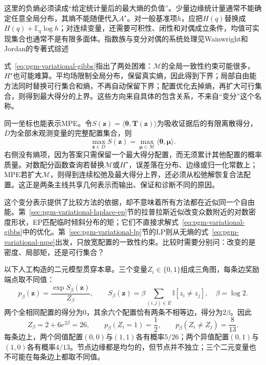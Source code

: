 这里的负熵必须读成“给定统计量后的最大熵的负值”。少量边缘统计量通常不能确定任意全局分布，其熵不能随便代入$A^\star$。对一般基准项$h$，应把$H(q)$替换成$H(q)+\mathbb E_q\log h$；对连续变量，还需要可积性、闭性和对偶成立条件，均值可实现集合也通常不是有限多面体。指数族与变分对偶的系统处理见Wainwright和Jordan的专著式综述

式~\eqref{eq:pgm-variational-gibbs}指出了两处困难：$\mathcal M$的全局一致性约束可能很多，$H^\star$也可能难算。平均场限制全局分布，保留真实熵，因此得到下界；局部自由能方法同时替换可行集合和熵，不再自动保留下界；配置优化去掉熵，再扩大可行集合，则得到最大得分的上界。这些方向来自具体的包含关系，不来自“变分”这个名称。

同一坐标也能表示MPE。令$S(\bm z)=\langle\bm{\theta},\bm T(\bm z)\rangle$为吸收证据后的有限离散得分，$D$为全部未观测变量的完整配置集合，则
\begin{equation}
  \max_{\bm z\in D}S(\bm z)
    =\max_{\bm{\mu}\in\mathcal M}
       \langle\bm{\theta},\bm{\mu}\rangle.
  \label{eq:pgm-variational-mpe}
\end{equation}
右侧没有熵项，因为答案只需保留一个最大得分配置，而无须累计其他配置的概率质量。对数配分函数查询若替换$\mathcal M$或$H^\star$，误差落在分布、边缘或归一化常数上；MPE若扩大$\mathcal M$，则得到连续松弛及最大得分上界，还必须从松弛解恢复合法配置。这正是两条主线共享几何表示而输出、保证和诊断不同的原因。

这个变分表示提供了比较方法的依据，却不意味着所有方法都在近似同一个自由能。第~\ref{sec:pgm-variational-laplace-ep}节的拉普拉斯近似改变众数附近的对数密度形状，EP匹配临时倾斜分布的矩；它们不直接求解式~\eqref{eq:pgm-variational-gibbs}中的优化。第~\ref{sec:pgm-variational-lp}节的LP则从无熵的式~\eqref{eq:pgm-variational-mpe}出发，只放宽配置的一致性约束。比较时需要分别问：改变的是密度、局部矩，还是可行集合？

\begin{example}[三角图的精确基准]
  \label{ex:pgm-variational-triangle}
  以下人工构造的二元模型贯穿本章。三个变量$Z_i\in\{0,1\}$组成三角图，每条边奖励端点取不同值：
  \begin{equation}
    p_\beta(\bm{z})=\frac{\exp S_\beta(\bm{z})}{Z_\beta},
    \qquad
    S_\beta(\bm{z})
      =\beta\sum_{(i,j)\in E}\mathbb I[z_i\ne z_j],
    \quad \beta=\log2.
    \label{eq:pgm-variational-triangle}
  \end{equation}
  两个全相同配置的得分为$0$，其余六个配置恰有两条不相等边，得分为$2\beta$。因此
  \[
    Z_\beta=2+6e^{2\beta}=26,\qquad
    p_\beta(Z_i=1)=\frac12,\qquad
    p_\beta(Z_i\ne Z_j)=\frac{8}{13}.
  \]
  每条边上，两个同值配置$(0,0)$与$(1,1)$各有概率$5/26$；两个异值配置$(0,1)$与$(1,0)$各有概率$4/13$。节点边缘都是均匀的，但节点并不独立；三个二元变量也不可能在每条边上都取不同值。
\end{example}

